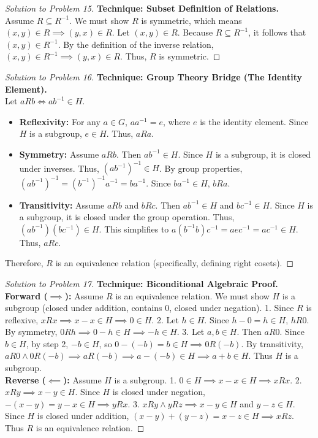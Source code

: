 \documentclass[11pt, a4paper]{article}
\theoremstyle{definition}
\theoremstyle{remark}
\begin{document}
\begin{proof}[Solution to Problem 15]
    \textbf{Technique: Subset Definition of Relations.} \\
    Assume $R \subseteq R^{-1}$. We must show $R$ is symmetric, which means $(x,y) \in R \implies (y,x) \in R$. Let $(x,y) \in R$. Because $R \subseteq R^{-1}$, it follows that $(x,y) \in R^{-1}$. By the definition of the inverse relation, $(x,y) \in R^{-1} \implies (y,x) \in R$. Thus, $R$ is symmetric.
\end{proof}

\begin{proof}[Solution to Problem 16]
    \textbf{Technique: Group Theory Bridge (The Identity Element).} \\
    Let $aRb \iff ab^{-1} \in H$.
    \begin{itemize}
        \item \textbf{Reflexivity:} For any $a \in G$, $aa^{-1} = e$, where $e$ is the identity element. Since $H$ is a subgroup, $e \in H$. Thus, $aRa$.
        \item \textbf{Symmetry:} Assume $aRb$. Then $ab^{-1} \in H$. Since $H$ is a subgroup, it is closed under inverses. Thus, $(ab^{-1})^{-1} \in H$. By group properties, $(ab^{-1})^{-1} = (b^{-1})^{-1}a^{-1} = ba^{-1}$. Since $ba^{-1} \in H$, $bRa$.
        \item \textbf{Transitivity:} Assume $aRb$ and $bRc$. Then $ab^{-1} \in H$ and $bc^{-1} \in H$. Since $H$ is a subgroup, it is closed under the group operation. Thus, $(ab^{-1})(bc^{-1}) \in H$. This simplifies to $a(b^{-1}b)c^{-1} = aec^{-1} = ac^{-1} \in H$. Thus, $aRc$.
    \end{itemize}
    Therefore, $R$ is an equivalence relation (specifically, defining right cosets).
\end{proof}

\begin{proof}[Solution to Problem 17]
    \textbf{Technique: Biconditional Algebraic Proof.} \\
    \textbf{Forward ($\implies$):} Assume $R$ is an equivalence relation. We must show $H$ is a subgroup (closed under addition, contains 0, closed under negation).
    1. Since $R$ is reflexive, $xRx \implies x-x \in H \implies 0 \in H$.
    2. Let $h \in H$. Since $h-0 = h \in H$, $hR0$. By symmetry, $0Rh \implies 0-h \in H \implies -h \in H$.
    3. Let $a, b \in H$. Then $aR0$. Since $b \in H$, by step 2, $-b \in H$, so $0 - (-b) = b \in H \implies 0R(-b)$. By transitivity, $aR0 \land 0R(-b) \implies aR(-b) \implies a - (-b) \in H \implies a+b \in H$. Thus $H$ is a subgroup. \\
    \textbf{Reverse ($\impliedby$):} Assume $H$ is a subgroup.
    1. $0 \in H \implies x-x \in H \implies xRx$.
    2. $xRy \implies x-y \in H$. Since $H$ is closed under negation, $-(x-y) = y-x \in H \implies yRx$.
    3. $xRy \land yRz \implies x-y \in H$ and $y-z \in H$. Since $H$ is closed under addition, $(x-y)+(y-z) = x-z \in H \implies xRz$. Thus $R$ is an equivalence relation.
\end{proof}
\end{document}

